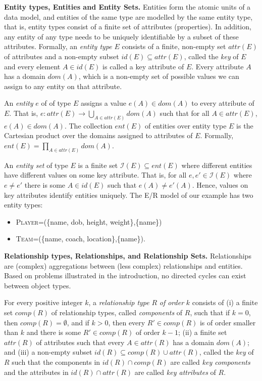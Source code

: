 \documentclass[sigconf]{acmart}
\begin{document}
\textbf{Entity types, Entities and Entity Sets.} Entities form the atomic units of a data model, and entities of the same type are modelled by the same entity type, that is, entity types consist of a finite set of attributes (properties). In addition, any entity of any type needs to be uniquely identifiable by a subset of these attributes. Formally, an \emph{entity type} $E$ consists of a finite, non-empty set $\textit{attr}(E)$ of attributes and a non-empty subset $\textit{id}(E)\subseteq\textit{attr}(E)$, called the \emph{key} of $E$ and every element $A\in\textit{id}(E)$ is called a key attribute of $E$. Every attribute $A$ has a domain $\textit{dom}(A)$, which is a non-empty set of possible values we can assign to any entity on that attribute.

An \emph{entity} $e$ of of type $E$ assigns a value $e(A)\in\textit{dom}(A)$ to every attribute of $E$. That is, $e:\textit{attr}(E)\rightarrow\bigcup_{A\in\textit{attr}(E)}\textit{dom}(A)$ such that for all $A\in\textit{attr}(E)$, $e(A)\in\textit{dom}(A)$. The collection $\textit{ent}(E)$ of entities over entity type $E$ is the Cartesian product over the domains assigned to attributes of $E$. Formally, $\textit{ent}(E)=\prod_{A\in\textit{attr}(E)}\textit{dom}(A)$.

An \emph{entity set} of type $E$ is a finite set $\mathcal{I}(E)\subseteq\textit{ent}(E)$ where different entities have different values on some key attribute. That is, for all $e,e'\in\mathcal{I}(E)$ where $e\neq e'$ there is some $A\in\textit{id}(E)$ such that $e(A)\neq e'(A)$. Hence, values on key attributes identify entities uniquely. The E/R model of our example has two entity types:
\begin{itemize}
\item \textsc{Player}=(\{name, dob, height, weight\},\{name\})
\item \textsc{Team}=(\{name, coach, location\},\{name\}).
\end{itemize}

\textbf{Relationship types, Relationships, and Relationship Sets.} Relationships are (complex) aggregations between (less complex) relationships and entities. Based on problems illustrated in the introduction, no directed cycles can exist between object types.

For every positive integer $k$, a \emph{relationship type} $R$ \emph{of order} $k$ consists of (i) a finite set $\textit{comp}(R)$ of relationship types, called \emph{components} of $R$, such that if $k=0$, then $\textit{comp}(R)=\emptyset$, and  if $k>0$, then every $R'\in\textit{comp}(R)$ is of order smaller than $k$ and there is some $R'\in\textit{comp}(R)$ of order $k-1$; (ii) a finite set $\textit{attr}(R)$ of attributes such that every $A\in\textit{attr}(R)$ has a domain $\textit{dom}(A)$; and (iii) a non-empty subset $\textit{id}(R)\subseteq\textit{comp}(R)\cup\textit{attr}(R)$, called the \emph{key} of $R$ such that the components in $\textit{id}(R)\cap\textit{comp}(R)$ are called \emph{key components} and the attributes in $\textit{id}(R)\cap\textit{attr}(R)$ are called \emph{key attributes} of $R$.
\end{document}
